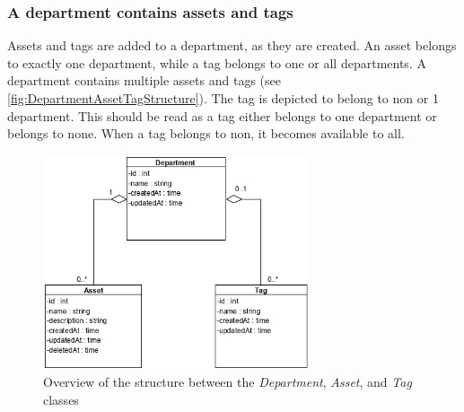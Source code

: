 

\subsubsection{A department contains assets and tags}
Assets and tags are added to a department, as they are created. An asset belongs to exactly one department, while a tag belongs to one or all departments. A department contains multiple assets and tags (see \autoref{fig:DepartmentAssetTagStructure}). The tag is depicted to belong to non or 1 department. This should be read as a tag either belongs to one department or belongs to none. When a tag belongs to non, it becomes available to all.

\begin{figure}[H]
    \centering
    \includegraphics[width=0.7\textwidth]{figures/Structures/DepartmentAssetTagStructure.png}
    \caption{Overview of the structure between the \textit{Department}, \textit{Asset}, and \textit{Tag} classes}
    \label{fig:DepartmentAssetTagStructure}
\end{figure}

